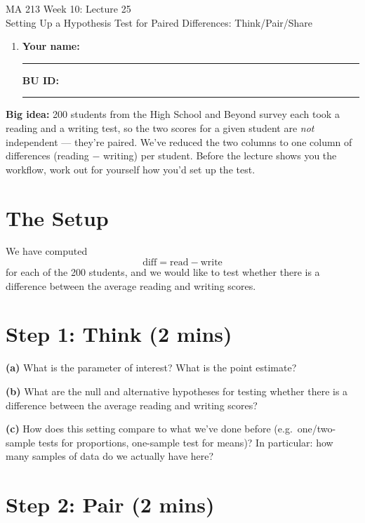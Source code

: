 \documentclass{article}
\newcommand{\coursenumber}{MA 213}
\newcommand{\weekplaceholder}{10}
\newcommand{\lectureplaceholder}{25}
\newcommand{\lecturetitle}{Setting Up a Hypothesis Test for Paired Differences: Think/Pair/Share}
\newcommand{\nameblank}{\rule{1.75in}{0.4pt}}
\newcommand{\idblank}{\rule{1.55in}{0.4pt}}
\begin{document}
\begin{center}
  {\LARGE \coursenumber{} Week \weekplaceholder{}: Lecture \lectureplaceholder{}}\\
  {\large \lecturetitle{}}
\end{center}

\begin{enumerate}[label=\arabic*.,leftmargin=*,itemsep=.7em]
  \item \textbf{Your name:} \nameblank \hfill \textbf{BU ID:} \idblank
\end{enumerate}

\textbf{Big idea:} 200 students from the High School and Beyond survey each took a reading and a writing test, so the two scores for a given student are \emph{not} independent --- they're paired. We've reduced the two columns to one column of differences (reading $-$ writing) per student. Before the lecture shows you the workflow, work out for yourself how you'd set up the test.

\section*{The Setup}

We have computed \[ \text{diff} = \text{read} - \text{write} \] for each of the 200 students, and we would like to test whether there is a difference between the average reading and writing scores.

\section*{Step 1: Think (2 mins)}

\textbf{(a)} What is the parameter of interest? What is the point estimate?
\vspace{0.7in}

\textbf{(b)} What are the null and alternative hypotheses for testing whether there is a difference between the average reading and writing scores?
\vspace{0.7in}

\textbf{(c)} How does this setting compare to what we've done before (e.g.\ one/two-sample tests for proportions, one-sample test for means)? In particular: how many samples of data do we actually have here?
\vspace{0.7in}

\newpage
\section*{Step 2: Pair (2 mins)}
\end{document}
